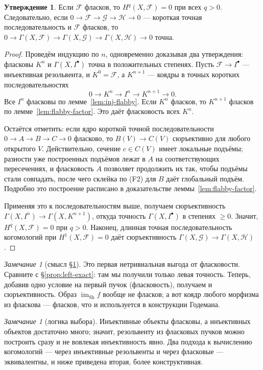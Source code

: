\documentclass[11pt,b5paper]{article}
\newcommand{\Sh}{\mathrm{Sh}}
\newcommand{\Shv}[1]{\mathscr{#1}}   %
\theoremstyle{plain}
\theoremstyle{definition}
\theoremstyle{remark}
\newtheorem{reminner}[thminner]{Замечание}
\newcommand{\thmbeg}{%
  \par\smallskip
  \begin{lrbox}{\thmbox}%
  \begin{minipage}{\linewidth}}
\newcommand{\thmend}{%
  \end{minipage}%
  \end{lrbox}%
  \noindent\usebox{\thmbox}%
  \par\smallskip}
\newenvironment{rem}{\thmbeg\begin{reminner}}{\end{reminner}\thmend}
\theoremstyle{definition}
\newtheorem{utvinner}[thminner]{Утверждение}
\newenvironment{utv}{\thmbeg\begin{utvinner}}{\end{utvinner}\thmend}
\renewcommand{\thmbeg}{\par\smallskip}
\renewcommand{\thmend}{\par\smallskip}
\begin{document}
\begin{utv}\label{thm:flabby-acyclic}
Если $\Shv{F}$ фласков, то $H^q(X,\Shv{F})=0$ при всех $q>0$.
Следовательно, если $0\to\Shv{F}\to\Shv{G}\to\Shv{H}\to0$ --- короткая
точная последовательность и $\Shv{F}$ фласков, то
$0\to\Gamma(X,\Shv{F})\to\Gamma(X,\Shv{G})\to
\Gamma(X,\Shv{H})\to0$ точна.
\end{utv}

\begin{proof}
Проведём индукцию по $n$, одновременно доказывая два утверждения:
фласковы $K^n$ и $\Gamma(X,I^\bullet)$ точна в положительных
степенях. Пусть $\Shv{F}\to I^\bullet$ --- инъективная резольвента,
и $K^0=\Shv{F}$, а $K^{n+1}$ --- коядры в точных коротких
последовательностях
\[
  0\longrightarrow K^n\longrightarrow I^n\longrightarrow
  K^{n+1}\longrightarrow0.
\]
Все $I^n$ фласковы по лемме~\ref{lem:inj-flabby}. Если $K^n$
фласков, то $K^{n+1}$ фласков по лемме~\ref{lem:flabby-factor}. Это
даёт фласковость всех $K^n$.

Остаётся отметить: если ядро короткой точной последовательности
$0\to A\to B\to C\to0$ фласково, то $B(V)\to C(V)$ сюръективно для
любого открытого $V$. Действительно, сечение $c\in C(V)$ имеет
локальные подъёмы; разности уже построенных подъёмов лежат в
$A$ на соответствующих пересечениях, и фласковость $A$ позволяет
продолжить их так, чтобы подъёмы стали совпадать, после чего
склейка по (F2) для $B$ даёт глобальный подъём. Подробно это
построение расписано в доказательстве леммы~\ref{lem:flabby-factor}.

Применяя это к последовательностям выше, получаем сюръективность
$\Gamma(X,I^n)\to\Gamma(X,K^{n+1})$, откуда точность
$\Gamma(X,I^\bullet)$ в степенях $\ge0$. Значит, $H^q(X,\Shv{F})=0$
при $q>0$. Наконец, длинная точная последовательность когомологий
при $H^1(X,\Shv{F})=0$ даёт сюръективность
$\Gamma(X,\Shv{G})\to\Gamma(X,\Shv{H})$.
\end{proof}

\begin{rem}[смысл \S\ref{thm:flabby-acyclic}]
Это первая нетривиальная выгода от фласковости. Сравните с
\S\ref{prop:left-exact}: там мы получили только левая точность.
Теперь, добавив одно условие на первый пучок (фласковость),
получаем и сюръективность. Образ $\operatorname{im}_{\Sh}f$ вообще не фласков;
а вот коядр любого морфизма из фласкова --- фласков, что и
используется в конструкции Годемана.
\end{rem}

\begin{rem}[логика выбора]
Инъективные объекты фласковы, а инъективных объектов достаточно
много; значит, резольвенту из фласковых пучков можно построить сразу
и не вовлекая инъективность явно. Два подхода к вычислению когомологий
--- через инъективные резольвенты и через фласковые --- эквивалентны,
и ниже приведена вторая, более конструктивная.
\end{rem}
\end{document}
